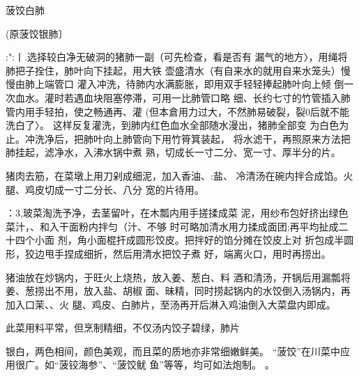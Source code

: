 \begin{recipe}{菠饺白肺}

(原菠饺银肺〕

\ingredients


\cooking

:":丨.选择较白净无破洞的猪肺一副（可先检查，看是否有 漏气的地方〉，用绳将肺把子拴住，肺叶向下挂起，用大铁 壶盛清水（有自来水的就用自来水笼头）慢慢由肺上端管口 灌入冲洗，待肺内水满膨胀，即用双手轻轻捧起肺叶向上倾 倒一次血水。灌时若遇血块阻塞停滞，可用一比肺管口略 细、长约七寸的竹管插入肺管内用手轻拍，使之畅通再、灌 (但本倉用力过大，不然肺易破裂，裂0后就不能洗白了〉。 这样反复灌洗，到肺内红色血水全部随水漫出，猪肺全部变 为白色为止。冲洗净后，把肺叶向上肺管向下用竹筲箕装起， 将水滤干，再照原来方法把肺挂起，滤净水，入沸水锅中煮 熟，切成长一寸二分、宽一寸、厚半分的片。

\step 猪肉去筋，在菜墩上用刀剁成细泥，加入香油、:盐、 冷清汤在碗内拌合成馅。火腿、鸡皮切成一寸二分长、八分 宽的片待用。

：3,玻菜淘洗予净，去茎留叶，在木瓢内用手搓揉成菜 泥，用纱布包好挤出绿色菜汁，、和入干面粉内拌匀（汁、不够 时可略加清水用力揉成面团;再平均扯成二十四个小面 剂，角小面棍扞成圆形饺皮。把拌好的馅分摊在饺皮上对 折包成半圆形，狡边甩手捏成细折，然后用清水把饺子煮 好，端离火口，用时再捞出。

\step 猪油放在炒锅内，于旺火上烧热，放入姜、葱白、料 酒和清汤，开锅后用漏瓢将姜、葱捞出不用，放入盐、胡椒 面、昧精，同时捞起锅内的水饺倒入汤锅内，再加入口茉、、火 腿、鸡皮、白肺片，至汤再开后淋入鸡油倒入大菜盘内即成。

\notes

此菜用料平常，但烹制精细，不仅汤内饺子碧绿，肺片

银白，两色相间，颜色美观，而且菜的质地亦非常细嫩鲜美。 “菠饺”在川菜中应用很广。如“菠铰海参”、“菠饺鱿 鱼”等等，均可如法炮制。	。

\end{recipe}

